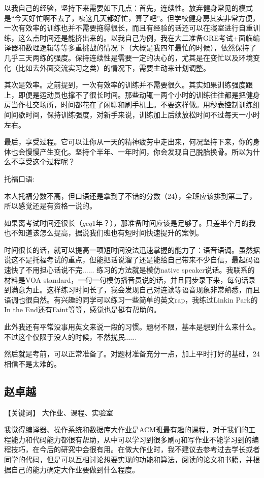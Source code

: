 \documentclass{vivid_layout}
\begin{document}
以我自己的经验，坚持下来需要如下几点：首先，连续性。放弃健身常见的模式是“今天好忙啊不去了，咦这几天都好忙，算了吧”。但学校健身房其实非常方便，一次有效率的训练也并不需要拖得很长，而且有经验的话还可以在寝室进行自重训练，这么点时间还是能挤出来的。以我自己为例，我在大二准备GRE考试+面临编译器和数理逻辑等等多重挑战的情况下（大概是我四年最忙的时候），依然保持了几乎三天两练的强度。保持连续性是需要一定的决心的，尤其是在变忙以及环境变化（比如去外面交流实习之类）的情况下，需要主动来计划调整。

其次是效率。之前提到，一次有效率的训练并不需要很久。其实如果训练强度跟上，即便是运动员也撑不了很长时间。那些动辄一两个小时的训练往往都是把健身房当作社交场所，时间都花在了闲聊和刷手机上。不要这样做。用秒表控制训练组间间歇时间，保持训练强度，对新手来说，训练加上后续放松时间不过每天一小时左右。

最后，享受过程。它可以让你从一天的精神疲劳中走出来，何况坚持下来，你的身体也会慢慢产生变化。坚持个半年、一年时间，你会发现自己脱胎换骨。所以为什么不享受这个过程呢？

托福口语:

本人托福分数不高，但口语还是拿到了不错的分数（24），全班应该排到第二了，所以感觉还是有资格一说的。

如果离考试时间还很长（$geq$1年？），那准备时间应该是足够了。只差半个月的我也不知道该怎么提高，据说我们班也有短时间快速提升的案例。

时间很长的话，就可以提高一项短时间没法迅速掌握的能力了：语音语调。虽然据说这不是托福考试的重点，但能把话说溜了还是能给自己带来不少自信，最起码语速快了不用担心话说不完...... 练习的方法就是模仿native speaker说话。我联系的材料是VOA standard，一句一句模仿播音员说的话，并且同步录下来，每句话录到满意为止。这样练习时间长了，我会发现自己对连读等语音现象非常熟悉，而且语调也很自然。有兴趣的同学可以练习一些简单的英文rap，我练过Linkin Park的In the End还有Faint等等，感觉也是挺有帮助的。

此外我还有平常没事用英文来说一段的习惯。题材不限，基本是想到什么来什么。不过这个仅限于没人的时候，不然扰民...... 

然后就是考前，可以正常准备了。对题材准备充分一点，加上平时打好的基础，24相信不是太难的。

\subsection{{ 赵卓越}}

【关键词】 大作业、课程、实验室

我觉得编译器、操作系统和数据库大作业是ACM班最有趣的课程，对于我们的工程能力和代码能力都很有帮助，从中可以学习到很多刷oj和写作业不能学习到的编程技巧，在今后的研究中会很有用。在做大作业时，我不建议去参考过去学长或者同学的代码，但是可以互相讨论想要实现的功能和算法，阅读的论文和书籍，并根据自己的能力确定大作业要做到什么程度。
\end{document}
